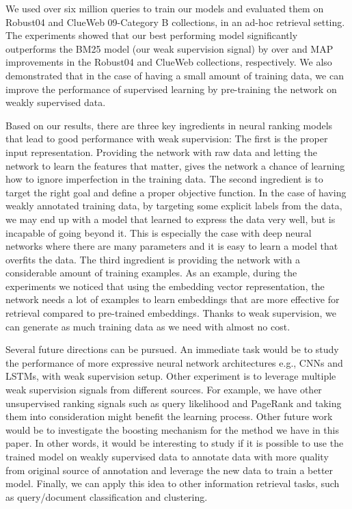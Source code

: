 \documentclass[sigconf]{acmart}
\newcommand{\feedthree}{embedding vector representation\xspace}
\begin{document}
We used over six million queries to train our models and evaluated them on Robust04 and ClueWeb 09-Category B collections, in an ad-hoc retrieval setting. 
The experiments showed that our best performing model significantly outperforms the BM25 model (our weak supervision signal) by over  and  MAP improvements in the Robust04 and ClueWeb collections, respectively. 
We also demonstrated that in the case of having a small amount of training data, we can improve the performance of supervised learning by pre-training the network on weakly supervised data.

Based on our results, there are three key ingredients in neural ranking models that lead to good performance with weak supervision:
The first is the proper input representation. Providing the network with raw data and letting the network to learn the features that matter, gives the network a chance of learning how to ignore imperfection in the training data.
The second ingredient is to target the right goal and define a proper objective function. In the case of having weakly annotated training data, by targeting some explicit labels from the data, we may end up with a model that learned to express the data very well, but is incapable of going beyond it. 
This is especially the case with deep neural networks where there are many parameters and it is easy to learn a model that overfits the data.
The third ingredient is providing the network with a considerable amount of training examples. 
As an example, during the experiments we noticed that using the \feedthree, the network needs a lot of examples to learn embeddings that are more effective for retrieval compared to pre-trained embeddings. 
Thanks to weak supervision, we can generate as much training data as we need with almost no cost.



Several future directions can be pursued. 
An immediate task would be to study the performance of more expressive neural network architectures e.g., CNNs and LSTMs, with weak supervision setup.  
Other experiment is to leverage multiple weak supervision signals from different sources. For example, we have other unsupervised ranking signals such as query likelihood and PageRank and taking them into consideration might benefit the learning process. 
Other future work would be to investigate the boosting mechanism for the method we have in this paper. In other words, it would be interesting to study if it is possible to use the trained model on weakly supervised data to annotate data with more quality from original source of annotation and leverage the new data to train a better model. 
Finally, we can apply this idea to other information retrieval tasks, such as query/document classification and clustering.
\end{document}
